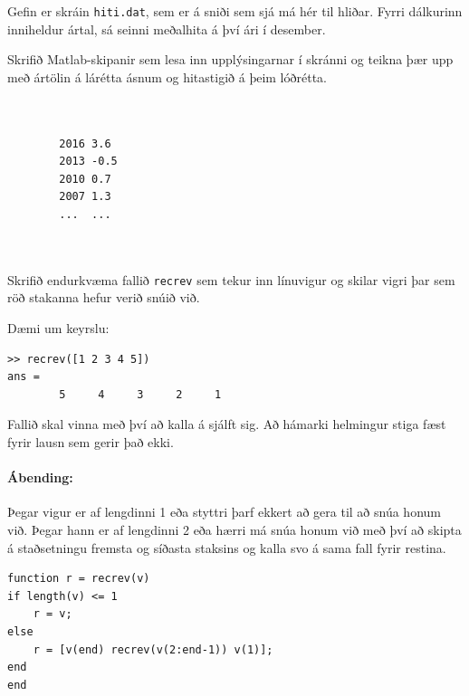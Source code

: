 \documentclass[addpoints]{exam}
\begin{document}
\begin{questions}
\newpage

\question[10]

\begin{multicols}{2}
Gefin er skráin \texttt{hiti.dat}, sem er á sniði sem sjá má hér til hliðar. Fyrri dálkurinn inniheldur ártal, sá seinni meðalhita á því ári í desember. 

Skrifið Matlab-skipanir sem lesa inn upplýsingarnar í skránni og teikna þær upp með ártölin á lárétta ásnum og hitastigið á þeim lóðrétta.

\begin{verbatim}
    
    
        2016 3.6
        2013 -0.5 
        2010 0.7
        2007 1.3
        ...  ...
    
    
\end{verbatim}
\end{multicols}


\newpage

\question[10] Skrifið endurkvæma fallið \texttt{recrev} sem tekur inn línuvigur og skilar vigri þar sem röð stakanna hefur verið snúið við.

Dæmi um keyrslu:
\begin{verbatim}
>> recrev([1 2 3 4 5])
ans =
        5     4     3     2     1
\end{verbatim}

Fallið skal vinna með því að kalla á sjálft sig. Að hámarki helmingur stiga fæst fyrir lausn sem gerir það ekki.

\paragraph{Ábending:} Þegar vigur er af lengdinni 1 eða styttri þarf ekkert að gera til að snúa honum við. Þegar hann er af lengdinni 2 eða hærri má snúa honum við með því að skipta á staðsetningu fremsta og síðasta staksins og kalla svo á sama fall fyrir restina.

\begin{solution}
\begin{verbatim}
function r = recrev(v)
if length(v) <= 1
    r = v;
else
    r = [v(end) recrev(v(2:end-1)) v(1)];
end
end
\end{verbatim}    
\end{solution}


\end{questions}
\end{document}
